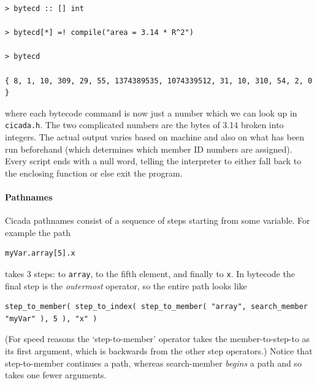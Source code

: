 \documentclass{article}
\newenvironment{code}{
       \begin{list}{}{
               \setlength{\leftmargin}{.4in}
               \setlength{\rightmargin}{0in}
               \setlength{\topsep}{.2in}
       }
       \small
       \item[] }
       { \end{list}   }
\begin{document}
\begin{code} \begin{verbatim}
> bytecd :: [] int

> bytecd[*] =! compile("area = 3.14 * R^2")

> bytecd

{ 8, 1, 10, 309, 29, 55, 1374389535, 1074339512, 31, 10, 310, 54, 2, 0 }
\end{verbatim} \end{code}

\noindent where each bytecode command is now just a number which we can look up in \verb#cicada.h#.  The two complicated numbers are the bytes of 3.14 broken into integers.  The actual output varies based on machine and also on what has been run beforehand (which determines which member ID numbers are assigned).   Every script ends with a null word, telling the interpreter to either fall back to the enclosing function or else exit the program.



\paragraph{Pathnames} 

Cicada pathnames consist of a sequence of steps starting from some variable.  For example the path 

\begin{code} \begin{verbatim}
myVar.array[5].x
\end{verbatim} \end{code}

\noindent takes 3 steps:  to \verb#array#, to the fifth element, and finally to \verb#x#.  In bytecode the final step is the \emph{outermost} operator, so the entire path looks like

\begin{code} \begin{verbatim}
step_to_member( step_to_index( step_to_member( "array", search_member "myVar" ), 5 ), "x" )
\end{verbatim} \end{code}

\noindent (For speed reasons the `step-to-member' operator takes the member-to-step-to as its first argument, which is backwards from the other step operators.)  Notice that step-to-member continues a path, whereas search-member \emph{begins} a path and so takes one fewer arguments.
\end{document}
